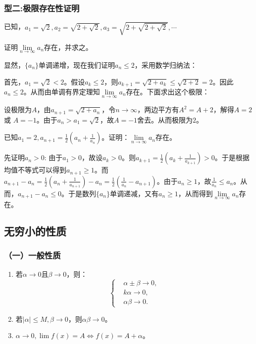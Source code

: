     \subsubsection*{型二:极限存在性证明}
    \begin{example}
        已知，$a_1=\sqrt{2}, a_2=\sqrt{2+\sqrt{2}}, a_3=\sqrt{2+\sqrt{2+\sqrt{2}}}, \cdots$

        证明$\lim\limits_{n \to \infty}a_n$存在，并求之。
    \end{example}
    \begin{solution}
        显然，$ \{a_n\} $单调递增，现在我们证明$ a_n \leq 2$，采用数学归纳法：

        首先，$ a_1=\sqrt{2}<2 $。假设$a_k\leq 2$，则$a_{k+1} =\sqrt{2+a_k}\leq \sqrt{2+2}=2$。因此 $a_n \leq 2$。从而由单调有界定理知$\lim\limits_{n \to \infty}a_n$存在。下面求出这个极限：

        设极限为$A$，由$a_{n+1}=\sqrt{2+a_n}$，令$ n \to \infty $，两边平方有$ A^2=A+2 $，解得$ A=2 $或 $ A=-1 $。由于$a_n>a_1=\sqrt{2}$，故$ A=-1 $舍去。从而极限为$ 2 $。
    \end{solution}

    \begin{example}
        已知$ a_1=2, a_{n+1}=\displaystyle\frac{1}{2}(a_n+\displaystyle\frac{1}{a_n})$。证明：$\lim\limits_{n \to \infty}a_n$存在。
    \end{example}
    \begin{solution}
        先证明$ a_n>0 $:
        由于$a_1>0$，故设$a_k>0$。则$a_{k+1}=\displaystyle\frac{1}{2}(a_k+\displaystyle\frac{1}{a_{k+1}})>0$。于是根据均值不等式可以得到$a_{n+1} \geq 1$。而$a_{n+1}-a_n=\displaystyle\frac{1}{2}(a_n+\displaystyle\frac{1}{a_{n+1}})-a_n=\displaystyle\frac{1}{2}(\displaystyle\frac{1}{a_n}-a_{n+1})$。由于$a_{n} \geq 1$，故$\displaystyle\frac{1}{a_n} \leq a_n$。从而，$a_{n+1}-a_n \leq 0$。于是数列$ \{a_n\} $单调递减，又有$a_n \geq 1$，从而得到$\lim\limits_{n \to \infty}a_n$存在。
    \end{solution}

    \subsection{无穷小的性质}
    \subsubsection*{（一）一般性质}
    \begin{enumerate}
        \item 若$ \alpha \to 0 $且$ \beta \to 0 $，则：
        \[ \left\{
            \begin{array}{rl}
                & \alpha \pm \beta  \to 0,\\
                & k \alpha  \to 0,\\
                & \alpha \beta  \to 0.
            \end{array} \right. \]
        \item 若$ \vert \alpha \vert \leq M, \beta \to 0$，则$\alpha \beta \to 0$。
        \item $\alpha \to 0, \lim\limits f(x)=A \Leftrightarrow f(x)=A+\alpha$。
    \end{enumerate}
